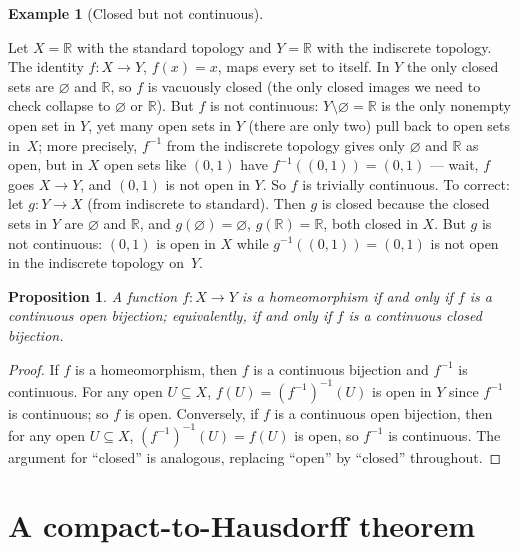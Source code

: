 \documentclass[11pt,a4paper,twoside]{book}
\newtheorem{proposition}[theorem]{Proposition}
\theoremstyle{remark}
\theoremstyle{definition}
\newtheorem{exampleplain}[theorem]{Example}
\theoremstyle{definition}
\newenvironment{example}[1][]{%
  \begin{exampleplain}[#1]\itshape
}{%
  \end{exampleplain}
}
\begin{document}
\begin{example}[Closed but not continuous]
\label{ex:closed-not-cont}
Let $X=\mathbb{R}$ with the standard topology and $Y=\mathbb{R}$ with the
indiscrete topology.  The identity $f\colon X\to Y$, $f(x)=x$, maps every
set to itself.  In $Y$ the only closed sets are $\varnothing$ and
$\mathbb{R}$, so $f$ is vacuously closed (the only closed images we need to
check collapse to $\varnothing$ or $\mathbb{R}$).  But $f$ is not
continuous: $Y\setminus\varnothing = \mathbb{R}$ is the only nonempty open
set in $Y$, yet many open sets in $Y$ (there are only two) pull back to open
sets in~$X$; more precisely, $f^{-1}$ from the indiscrete topology gives
only $\varnothing$ and $\mathbb{R}$ as open, but in $X$ open sets like
$(0,1)$ have $f^{-1}((0,1))=(0,1)$ --- wait, $f$ goes $X\to Y$, and
$(0,1)$ is not open in $Y$.  So $f$ is trivially continuous.  To correct:
let $g\colon Y\to X$ (from indiscrete to standard).  Then $g$ is closed
because the closed sets in $Y$ are $\varnothing$ and $\mathbb{R}$, and
$g(\varnothing)=\varnothing$, $g(\mathbb{R})=\mathbb{R}$, both closed in
$X$.  But $g$ is not continuous: $(0,1)$ is open in $X$ while
$g^{-1}((0,1))=(0,1)$ is not open in the indiscrete topology on~$Y$.
\end{example}

\begin{proposition}
\label{prop:homeo-iff-cont-open-bij}
A function $f\colon X\to Y$ is a homeomorphism if and only if $f$ is a
continuous open bijection; equivalently, if and only if $f$ is a continuous
closed bijection.
\end{proposition}

\begin{proof}
If $f$ is a homeomorphism, then $f$ is a continuous bijection and $f^{-1}$ is
continuous.  For any open $U\subseteq X$,
$f(U)=(f^{-1})^{-1}(U)$ is open in $Y$ since $f^{-1}$ is continuous; so $f$
is open.  Conversely, if $f$ is a continuous open bijection, then for any open
$U\subseteq X$, $(f^{-1})^{-1}(U)=f(U)$ is open, so $f^{-1}$ is continuous.
The argument for ``closed'' is analogous, replacing ``open'' by ``closed''
throughout.
\end{proof}

\section{A compact-to-Hausdorff theorem}
\label{sec:compact-hausdorff}
\end{document}
